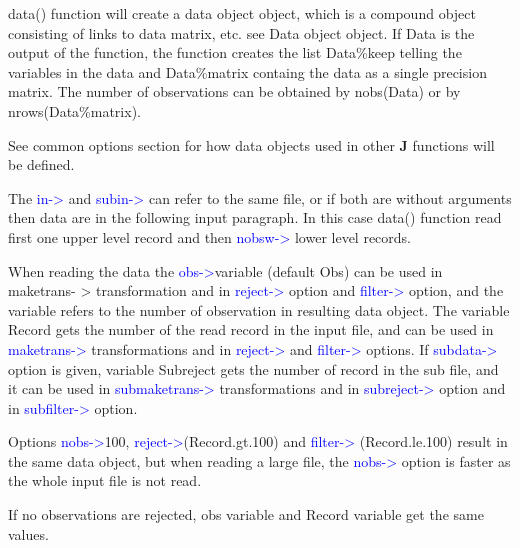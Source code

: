 \hline
\vspace{0.2cm}
\begin{note}
\textcolor{VioletRed}{data}() function will create a data object object, which is a compound object consisting
of links to data matrix, etc. see Data object object. If Data is the output
of the function, the function creates the list Data\%keep telling the
variables in the data and
Data\%matrix containg the data as a single precision matrix. The number of observations can be obtained by \textcolor{VioletRed}{nobs}(Data) or by
\textcolor{VioletRed}{nrows}(Data\%matrix).
\end{note}
\begin{note}
See common options section for how data objects used in other \textbf{J} functions will be defined.
\end{note}
\begin{note}
The \textcolor{blue}{in->} and \textcolor{blue}{subin->} can refer to the same file, or if both are without arguments
then data are in the following input paragraph. In this case \textcolor{VioletRed}{data}() function read first one
upper level record and then \textcolor{blue}{nobsw->} lower level records.
\end{note}
\begin{note}
When reading the data the \textcolor{blue}{obs->}variable (default Obs) can be used in maketrans-
> transformation and in \textcolor{blue}{reject->} option and \textcolor{blue}{filter->} option, and the variable refers to
the number of observation in resulting data object. The variable Record gets the number of
the read record in the input file, and can be used in \textcolor{blue}{maketrans->} transformations and in
\textcolor{blue}{reject->} and \textcolor{blue}{filter->} options. If \textcolor{blue}{subdata->} option is given, variable Subreject gets
the number of record in the sub file, and it can be used in \textcolor{blue}{submaketrans->} transformations
and in \textcolor{blue}{subreject->} option and in \textcolor{blue}{subfilter->} option.
\end{note}
\begin{note}
Options \textcolor{blue}{nobs->}100, \textcolor{blue}{reject->}(Record.gt.100) and \textcolor{blue}{filter->}
(Record.le.100) result in the same data object, but when reading a large file, the \textcolor{blue}{nobs->}
option is faster as the whole input file is not read.
\end{note}
\begin{note}
If no observations are rejected, obs variable and Record variable get the same values.
\end{note}
